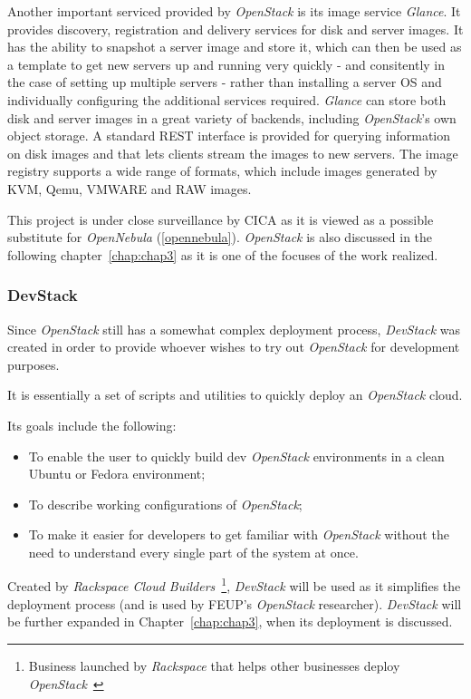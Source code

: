 Another important serviced provided by \textit{OpenStack} is its image service \textit{Glance}. It provides discovery, registration and delivery services for disk and server images. It has the ability to snapshot a server image and store it, which can then be used as a template to get new servers up and running very quickly - and consitently in the case of setting up multiple servers - rather than installing a server OS and individually configuring the additional services required. \textit{Glance} can store both disk and server images in a great variety of backends, including \textit{OpenStack}'s own object storage. A standard REST interface is provided for querying information on disk images and that lets clients stream the images to new servers. The image registry supports a wide range of formats, which include images generated by KVM, Qemu, VMWARE and RAW images.

This project is under close surveillance by CICA as it is viewed as a possible substitute for \textit{OpenNebula} (\ref{opennebula}). \textit{OpenStack} is also discussed in the following chapter~\ref{chap:chap3} as it is one of the focuses of the work realized.

\subsubsection{DevStack}\label{subsubsec:devstack}

Since \textit{OpenStack} still has a somewhat complex deployment process, \textit{DevStack} was created in order to provide whoever wishes to try out \textit{OpenStack} for development purposes.

It is essentially a set of scripts and utilities to quickly deploy an \textit{OpenStack} cloud.

Its goals include the following:
\begin{itemize}
\item To enable the user to quickly build dev \textit{OpenStack} environments in a clean Ubuntu or Fedora environment;
\item To describe working configurations of \textit{OpenStack};
\item To make it easier for developers to get familiar with \textit{OpenStack} without the need to understand every single part of the system at once.
\end{itemize}


Created by \textit{Rackspace Cloud Builders}~\footnote{Business launched by \textit{Rackspace} that helps other businesses deploy \textit{OpenStack}~\cite{http://www.rackspace.com/cloud/private_edition/}}, \textit{DevStack} will be used as it simplifies the deployment process (and is used by FEUP's \textit{OpenStack} researcher). \textit{DevStack} will be further expanded in Chapter~\ref{chap:chap3}, when its deployment is discussed.

